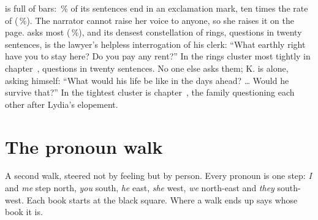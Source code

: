  is full of bars: \,\% of
its sentences end in an exclamation mark, ten times the rate of
 (\,\%). The narrator cannot raise her
voice to anyone, so she raises it on the page.  asks most
(\,\%), and its densest constellation of rings,
 questions in twenty sentences, is the lawyer's helpless
interrogation of his clerk: ``What earthly right have you to stay here? Do you
pay any rent?'' In  the rings cluster most tightly in
chapter~,  questions in twenty
sentences. No one else asks them; K. is alone, asking himself: ``What would
his life be like in the days ahead? \ldots{} Would he survive that?'' In
 the tightest cluster is chapter~,
the family questioning each other after Lydia's elopement.

\clearpage
\section{The pronoun walk}

\begin{center}
\end{center}

\noindent A second walk, steered not by feeling but by person. Every pronoun is
one step: \emph{I} and \emph{me} step north, \emph{you} south, \emph{he} east,
\emph{she} west, \emph{we} north-east and \emph{they} south-west. Each book
starts at the black square. Where a walk ends up says whose book it is.


